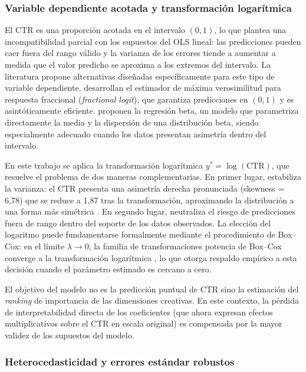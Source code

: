 \documentclass[12pt, a4paper]{report}
\begin{document}
\subsubsection*{Variable dependiente acotada y transformación logarítmica}

El CTR es una proporción acotada en el intervalo $(0, 1)$, lo que plantea una
incompatibilidad parcial con los supuestos del OLS lineal: las predicciones pueden
caer fuera del rango válido y la varianza de los errores tiende a aumentar a medida
que el valor predicho se aproxima a los extremos del intervalo. La literatura propone
alternativas diseñadas específicamente para este tipo de variable dependiente.
\citet{papke1996} desarrollan el estimador de máxima verosimilitud para respuesta
fraccional (\textit{fractional logit}), que garantiza predicciones en $(0,1)$ y es
asintóticamente eficiente. \citet{ferrari2004} proponen la regresión beta, un modelo
que parametriza directamente la media y la dispersión de una distribución beta, siendo
especialmente adecuado cuando los datos presentan asimetría dentro del intervalo.

En este trabajo se aplica la transformación logarítmica $y^* = \log(\text{CTR})$,
que resuelve el problema de dos maneras complementarias. En primer lugar, estabiliza
la varianza: el CTR presenta una asimetría derecha pronunciada (skewness = 6{,}78)
que se reduce a 1{,}87 tras la transformación, aproximando la distribución a una forma
más simétrica \citep[Cap.~12]{fox2016}. En segundo lugar, neutraliza el riesgo de
predicciones fuera de rango dentro del soporte de los datos observados. La elección
del logaritmo puede fundamentarse formalmente mediante el procedimiento de Box--Cox:
en el límite $\lambda \to 0$, la familia de transformaciones potencia de Box--Cox
converge a la transformación logarítmica \citep[Cap.~12]{fox2016}, lo que otorga
respaldo empírico a esta decisión cuando el parámetro estimado es cercano a cero.

El objetivo del modelo no es la predicción puntual de CTR sino la estimación del
\textit{ranking} de importancia de las dimensiones creativas. En este contexto,
la pérdida de interpretabilidad directa de los coeficientes (que ahora expresan
efectos multiplicativos sobre el CTR en escala original) es compensada por la
mayor validez de los supuestos del modelo.

\subsubsection*{Heterocedasticidad y errores estándar robustos}
\end{document}
